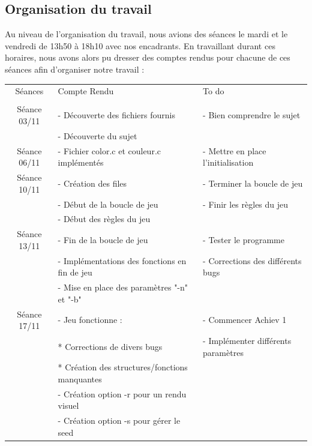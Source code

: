 \documentclass[a4paper]{article}
\begin{document}
\subsection{Organisation du travail}
Au niveau de l'organisation du travail, nous avions des séances le mardi et le vendredi de 13h50 à 18h10 avec nos encadrants. En travaillant durant ces horaires, nous avons alors pu dresser des comptes rendus pour chacune de ces séances afin d'organiser notre travail :

\begin{tabular}{|c|l|l|} \hline
     Séances & Compte Rendu & To do \\
     & & \\
     \hline
     
     Séance 03/11 
     & - Découverte des fichiers fournis & - Bien comprendre le sujet \\ 
     & - Découverte du sujet & \tabularnewline
     \hline
     
     Séance 06/11 
     & - Fichier color.c et couleur.c implémentés & - Mettre en place l'initialisation \tabularnewline
     \hline
     
     Séance 10/11 
     & - Création des files & - Terminer la boucle de jeu \\
     & - Début de la boucle de jeu & - Finir les règles du jeu \\
     & - Début des règles du jeu & \tabularnewline
     \hline
     
     Séance 13/11
     & - Fin de la boucle de jeu & - Tester le programme \\
     & - Implémentations des fonctions en fin de jeu & - Corrections des différents bugs \\
     & - Mise en place des paramètres "-n" et "-b" & \tabularnewline
     \hline
     
     Séance 17/11
     & - Jeu fonctionne : & - Commencer Achiev 1 \\
     & * Corrections de divers bugs & - Implémenter différents paramètres \\
     & * Création des structures/fonctions manquantes & \\
     & - Création option -r pour un rendu visuel & \\
     & - Création option -s pour gérer le seed & \tabularnewline
     \hline
     

\end{tabular}
\end{document}
